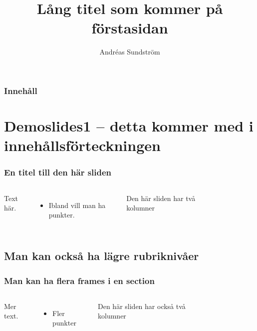 \documentclass{beamer}
\title[Kort titel]{Lång titel som kommer på förstasidan} %
\subtitle{} %
\author{Andréas Sundström } %
\institute[Chalmers]{Chalmers tekniska högskla}
\date{\vspace{-0.25cm}}
\begin{document}
\begin{frame}[plain]

\linethickness{0.075mm}

  \titlepage
\end{frame}









\begin{frame}
\frametitle{Innehåll}

\tableofcontents

\end{frame}




\section{Demoslides1 -- detta kommer med i innehållsförteckningen }
\begin{frame}
\frametitle{En titel till den här sliden}
 \begin{columns}[c]
Text här.
\begin{itemize}
    \item Ibland vill man ha punkter.
\end{itemize}
Den här sliden har två kolumner
\begin{figure}
\end{figure}
\end{columns}
\end{frame}

\subsection{Man kan också ha lägre rubriknivåer}
\begin{frame}
\frametitle{Man kan ha flera frames i en section}
 \begin{columns}[c]
Mer text.
\begin{itemize}
    \item Fler punkter
\end{itemize}
Den här sliden har också två kolumner
\begin{figure}
\end{figure}
\end{columns}
\end{frame}
\end{document}
